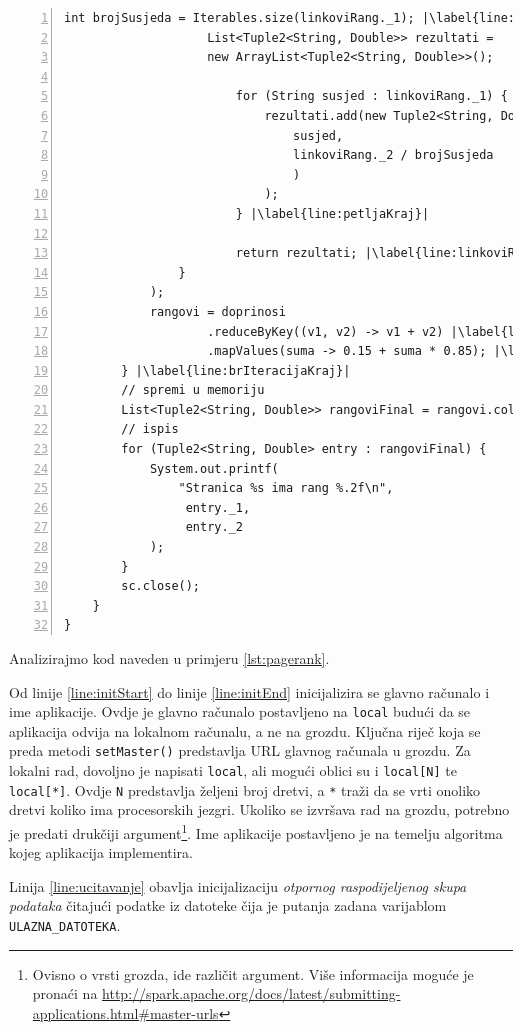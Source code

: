 \documentclass[times, utf8, zavrsni, numeric]{fer}
\begin{document}
\begin{lstlisting}[numbers=left, label={lst:pagerank}, caption={Algoritam \emph{PageRank}.}, escapechar=|]
					int brojSusjeda = Iterables.size(linkoviRang._1); |\label{line:brojSusjeda}|
					List<Tuple2<String, Double>> rezultati = 
					new ArrayList<Tuple2<String, Double>>();
					
						for (String susjed : linkoviRang._1) { |\label{line:petljaStart}|
							rezultati.add(new Tuple2<String, Double>(
								susjed,
								linkoviRang._2 / brojSusjeda
								)
							);
						} |\label{line:petljaKraj}|
						
						return rezultati; |\label{line:linkoviRangKraj}|					
				}
			);
			rangovi = doprinosi
					.reduceByKey((v1, v2) -> v1 + v2) |\label{line:zbrojPoKljucu}|
					.mapValues(suma -> 0.15 + suma * 0.85); |\label{line:postaviRang}|
		} |\label{line:brIteracijaKraj}|
		// spremi u memoriju
		List<Tuple2<String, Double>> rangoviFinal = rangovi.collect(); |\label{line:spremanjePodataka}|
		// ispis
		for (Tuple2<String, Double> entry : rangoviFinal) {
			System.out.printf(
				"Stranica %s ima rang %.2f\n",
				 entry._1,
				 entry._2
			);
		}
		sc.close();
	}
}
\end{lstlisting}
\vspace{5mm}

Analizirajmo kod naveden u primjeru \ref{lst:pagerank}. 

Od linije \ref{line:initStart} do linije \ref{line:initEnd} inicijalizira se glavno računalo i ime aplikacije. Ovdje je glavno računalo postavljeno na \texttt{local} budući da se aplikacija odvija na lokalnom računalu, a ne na grozdu. Ključna riječ koja se preda metodi \texttt{setMaster()} predstavlja URL glavnog računala u grozdu. Za lokalni rad, dovoljno je napisati \texttt{local}, ali mogući oblici su i \texttt{local[N]} te \texttt{local[*]}. Ovdje \texttt{N} predstavlja željeni broj dretvi, a \texttt{*} traži da se vrti onoliko dretvi koliko ima procesorskih jezgri. Ukoliko se izvršava rad na grozdu, potrebno je predati drukčiji argument\footnote{Ovisno o vrsti grozda, ide različit argument. Više informacija moguće je pronaći na \url{http://spark.apache.org/docs/latest/submitting-applications.html#master-urls}}. Ime aplikacije postavljeno je na temelju algoritma kojeg aplikacija implementira.

Linija \ref{line:ucitavanje} obavlja inicijalizaciju \emph{otpornog raspodijeljenog skupa podataka} čitajući podatke iz datoteke čija je putanja zadana varijablom \texttt{ULAZNA\_DATOTEKA}.
\end{document}
